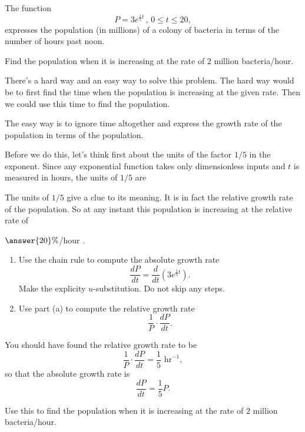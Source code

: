 \documentclass{ximera}
\begin{document}
\begin{example}  \label{Ex:KDFDFL}
The function
\[
       P = 3e^{\frac{1}{5}t} \, , \, 0\leq t \leq 20 ,
\]
expresses the population (in millions) of a colony of bacteria in terms of the number of hours past noon.

Find the population when it is increasing at the rate of $2$ million bacteria/hour.

\begin{explanation}
There's a hard way and an easy way to solve this problem. The hard way would be to first find the time when the population is increasing at the given rate. Then we could use this time to find the population.

The easy way is to ignore time altogether and express the growth rate of the population in terms of the population.

Before we do this, let's think first about the units of the factor $1/5$ in the exponent. Since any exponential function takes only dimensionless inputs and $t$ is measured in hours, the units of $1/5$ are 
\begin{question} \label{EROERERER}
\begin{multipleChoice}
\end{multipleChoice}
\end{question}

The units of $1/5$ give a clue to its meaning. It is in fact the relative growth rate of the population. So at any instant this population is increasing at the relative rate of 
\begin{question} \label{QERERERERER}
 $\answer{20}\%$/hour .
\end{question}

\begin{question}  \label{QODEERER}
\begin{enumerate}
\item Use the chain rule to compute the absolute growth rate
\[
\frac{dP}{dt} = \frac{d}{dt} \left(   3e^{\frac{1}{5}t}\right) .
\]
Make the explicity $u$-substitution. Do not skip any steps.

\item Use part (a) to compute the relative growth rate 
\[
  \frac{1}{P} \cdot \frac{dP}{dt} .
\]
\end{enumerate}

\end{question}

You should have found the relative growth rate to be
\[
   \frac{1}{P} \cdot \frac{dP}{dt} = \frac{1}{5}\text{ hr}^{-1} ,
\]
so that the absolute growth rate is
\[
 \frac{dP}{dt} = \frac{1}{5}P .
\]

\begin{question} \label{QERdfsdf}
Use this to find the population when it is increasing at the rate of $2$ million bacteria/hour.
\end{question}

\end{explanation}

\end{example}
\end{document}
